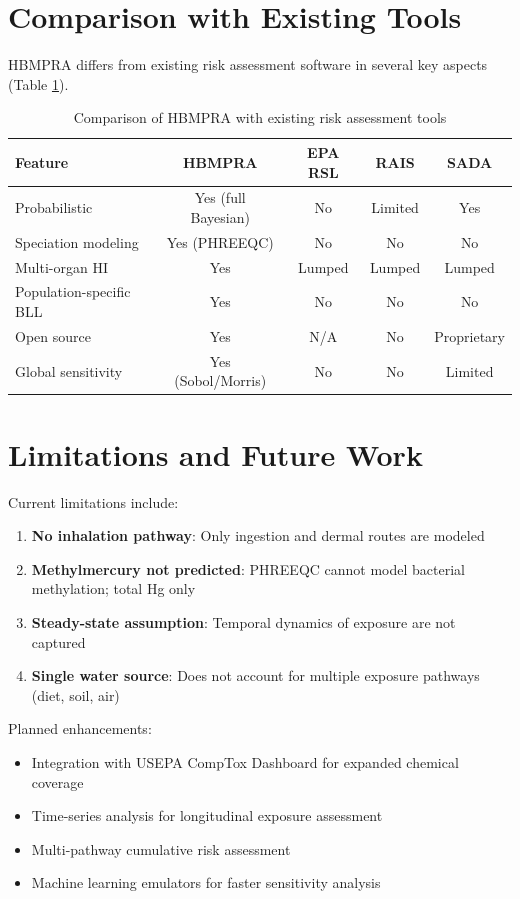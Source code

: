 \documentclass[11pt,a4paper]{article}
\begin{document}
\section{Comparison with Existing Tools}

HBMPRA differs from existing risk assessment software in several key aspects (Table \ref{tab:comparison}).

\begin{table}[H]
\centering
\caption{Comparison of HBMPRA with existing risk assessment tools}
\label{tab:comparison}
\begin{tabular}{@{}lcccc@{}}
\toprule
\textbf{Feature} & \textbf{HBMPRA} & \textbf{EPA RSL} & \textbf{RAIS} & \textbf{SADA} \\ \midrule
Probabilistic & Yes (full Bayesian) & No & Limited & Yes \\
Speciation modeling & Yes (PHREEQC) & No & No & No \\
Multi-organ HI & Yes & Lumped & Lumped & Lumped \\
Population-specific BLL & Yes & No & No & No \\
Open source & Yes & N/A & No & Proprietary \\
Global sensitivity & Yes (Sobol/Morris) & No & No & Limited \\ \bottomrule
\end{tabular}
\end{table}

\section{Limitations and Future Work}

Current limitations include:

\begin{enumerate}
    \item \textbf{No inhalation pathway}: Only ingestion and dermal routes are modeled
    \item \textbf{Methylmercury not predicted}: PHREEQC cannot model bacterial methylation; total Hg only
    \item \textbf{Steady-state assumption}: Temporal dynamics of exposure are not captured
    \item \textbf{Single water source}: Does not account for multiple exposure pathways (diet, soil, air)
\end{enumerate}

Planned enhancements:

\begin{itemize}
    \item Integration with USEPA CompTox Dashboard for expanded chemical coverage
    \item Time-series analysis for longitudinal exposure assessment
    \item Multi-pathway cumulative risk assessment
    \item Machine learning emulators for faster sensitivity analysis
\end{itemize}
\end{document}

